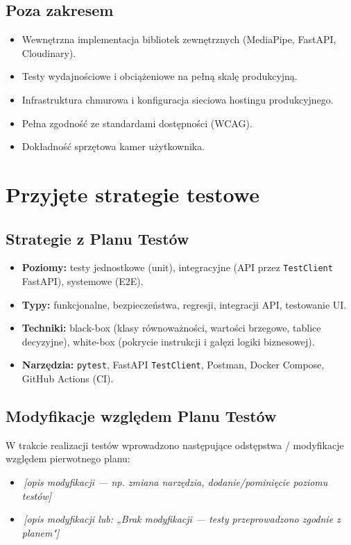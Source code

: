 \documentclass[11pt,a4paper]{article}
\newcommand{\luka}[1]{\colorbox{lukacol}{\,\textit{[#1]}\,}}
\begin{document}
\subsection{Poza zakresem}
\begin{itemize}
  \item Wewnętrzna implementacja bibliotek zewnętrznych (MediaPipe, FastAPI, Cloudinary).
  \item Testy wydajnościowe i obciążeniowe na pełną skalę produkcyjną.
  \item Infrastruktura chmurowa i konfiguracja sieciowa hostingu produkcyjnego.
  \item Pełna zgodność ze standardami dostępności (WCAG).
  \item Dokładność sprzętowa kamer użytkownika.
\end{itemize}

\section{Przyjęte strategie testowe}

\subsection{Strategie z Planu Testów}
\begin{itemize}
  \item \textbf{Poziomy:} testy jednostkowe (unit), integracyjne (API przez \texttt{TestClient} FastAPI), systemowe (E2E).
  \item \textbf{Typy:} funkcjonalne, bezpieczeństwa, regresji, integracji API, testowanie UI.
  \item \textbf{Techniki:} black-box (klasy równoważności, wartości brzegowe, tablice decyzyjne), white-box (pokrycie instrukcji i gałęzi logiki biznesowej).
  \item \textbf{Narzędzia:} \texttt{pytest}, FastAPI \texttt{TestClient}, Postman, Docker Compose, GitHub Actions (CI).
\end{itemize}

\subsection{Modyfikacje względem Planu Testów}
W trakcie realizacji testów wprowadzono następujące odstępstwa / modyfikacje względem pierwotnego planu:
\begin{itemize}
  \item \luka{opis modyfikacji — np. zmiana narzędzia, dodanie/pominięcie poziomu testów}
  \item \luka{opis modyfikacji lub: „Brak modyfikacji — testy przeprowadzono zgodnie z planem"}
\end{itemize}
\end{document}
